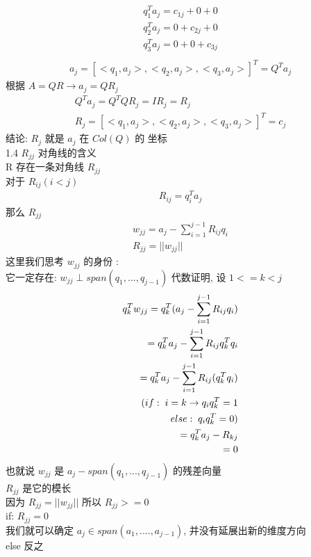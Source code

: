 \documentclass[12pt]{article}
\begin{document}
\begin{flushleft}
\begin{align}
        q_{1}^{T}a_{j} = c_{1j} + 0 + 0 \\
        q_{2}^{T}a_{j} = 0 + c_{2j} + 0 \\
        q_{3}^{T}a_{j} = 0 + 0 + c_{3j} \\
    \end{align}
    \begin{align}
        a_{j} = [
        <q_{1},a_{j}>, <q_{2},a_{j}>, <q_{3},a_{j}> ]^{T}
        = Q^{T}a_{j}
    \end{align}
    根据 $A = QR \to a_{j} = QR_{j}$ \\
    \begin{align}
        Q^{T}a_{j} = Q^{T}QR_{j} = IR_{j} = R_{j} \\
        R_{j} = [ <q_{1},a_{j}>, <q_{2},a_{j}>, <q_{3},a_{j}> ]^{T} = c_{j}
    \end{align}
    结论: $R_{j}$ 就是 $a_{j}$ 在 $Col(Q)$ 的 坐标 \\

    1.4 $R_{jj}$ 对角线的含义 \\
    R 存在一条对角线 $R_{jj}$ \\
    对于 $R_{ij} (i < j)$
    \begin{align}
        R_{ij} = q_{i}^{T}a_{j}
    \end{align}
    那么 $R_{jj}$
    \begin{align}
        w_{jj} = a_{j} - \sum_{i = 1}^{j -1}R_{ij}q_{i} \\
        R_{jj} = ||w_{jj}||
    \end{align}
    这里我们思考 $w_{jj}$ 的身份 :\\
    它一定存在: $w_{jj} \perp span(q_{1},..., q_{j - 1})$
    代数证明, 设 $1 <= k < j$ \\
    \begin{align}
        q_{k}^{T}w_{jj} = q_{k}^{T}(a_{j} - \sum_{i = 1}^{j -1}R_{ij}q_{i}) \\
        = q_{k}^{T}a_{j} - \sum_{i = 1}^{j -1}R_{ij}q_{k}^{T}q_{i}          \\
        = q_{k}^{T}a_{j} - \sum_{i = 1}^{j -1}R_{ij}(q_{k}^{T}q_{i})        \\
        \text(if: \; i = k \to q_{i}q_{k}^{T} = 1                           \\
        else:  \;  q_{i}q_{k}^{T} = 0 )                                     \\
        = q_{k}^{T}a_{j} - R_{kj}                                           \\
        = 0
    \end{align}
    也就说 $w_{jj}$ 是 $ a_{j}- span(q_{1},..., q_{j - 1})$ 的残差向量 \\
    $R_{jj}$ 是它的模长 \\
    因为 $R_{jj} = ||w_{jj}||$ 所以 $R_{jj} >= 0$ \\
    if: $R_{jj} = 0$ \\
    我们就可以确定 $a_{j} \in span(a_{1}, .... , a_{j -1})$, 并没有延展出新的维度方向 \\
    else 反之 \\

\end{flushleft}
\end{document}
